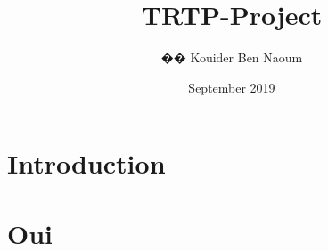\documentclass{article}
\title{TRTP-Project}
\author{�� Kouider Ben Naoum}
\date{September 2019}
\begin{document}
\maketitle

\section{Introduction}
\section{Oui}
\end{document}
